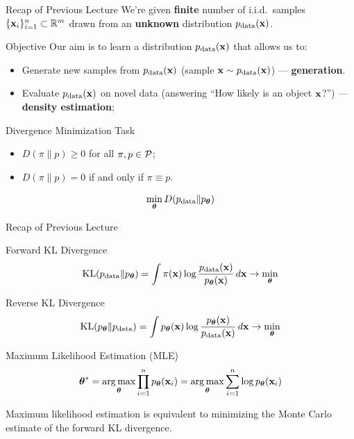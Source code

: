 \documentclass{beamer}
\begin{document}
\begin{frame}
\titlepage
\resetonslide
\end{frame}
\begin{frame}{Recap of Previous Lecture}
	We're given \textbf{finite} number of i.i.d.\ samples $\{\mathbf{x}_i\}_{i=1}^n \subset \mathbb{R}^m$ drawn from an \textbf{unknown} distribution $p_{\text{data}}(\mathbf{x})$.
	\begin{block}{Objective}
		Our aim is to learn a distribution $p_{\text{data}}(\mathbf{x})$ that allows us to: 
		\begin{itemize}
		    \item Generate new samples from $p_{\text{data}}(\mathbf{x})$ (sample $\mathbf{x} \sim p_{\text{data}}(\mathbf{x})$) --- \textbf{generation}.		    
		    \item Evaluate $p_{\text{data}}(\mathbf{x})$ on novel data (answering ``How likely is an object $\mathbf{x}$?'') --- \textbf{density estimation}; 
		\end{itemize}
	\end{block}

	\begin{block}{Divergence Minimization Task}
		\begin{itemize}
			\item $D(\pi \| p) \geq 0$ for all $\pi, p \in \mathcal{P}$;
			\item $D(\pi \| p) = 0$ if and only if $\pi \equiv p$.
		\end{itemize}
		\[
		\min_{\boldsymbol{\theta}} D(p_{\text{data}} \| p_{\boldsymbol{\theta}})
		\]
	\end{block}
\end{frame}
\begin{frame}{Recap of Previous Lecture}
	\begin{block}{Forward KL Divergence}
		\vspace{-0.2cm}
		\[
		\mathrm{KL}(p_{\text{data}} \| p_{\boldsymbol{\theta}}) = \int \pi (\mathbf{x}) \log \frac{p_{\text{data}}(\mathbf{x})}{p_{\boldsymbol{\theta}}(\mathbf{x})}\, d \mathbf{x} \rightarrow \min_{\boldsymbol{\theta}}
		\]
	\end{block}
	\begin{block}{Reverse KL Divergence}
		\vspace{-0.2cm}
		\[
		\mathrm{KL}(p_{\boldsymbol{\theta}} \| p_{\text{data}}) = \int p_{\boldsymbol{\theta}}(\mathbf{x}) \log \frac{p_{\boldsymbol{\theta}}(\mathbf{x})}{p_{\text{data}}(\mathbf{x})}\, d \mathbf{x} \rightarrow \min_{\boldsymbol{\theta}}
		\]
	\end{block}
	
	\begin{block}{Maximum Likelihood Estimation (MLE)}
		\vspace{-0.3cm}
		\[
		\boldsymbol{\theta}^* = \operatorname*{arg\,max}_{\boldsymbol{\theta}} \prod_{i=1}^n p_{\boldsymbol{\theta}}(\mathbf{x}_i) = \operatorname*{arg\,max}_{\boldsymbol{\theta}} \sum_{i=1}^n \log p_{\boldsymbol{\theta}}(\mathbf{x}_i)
		\]
		\vspace{-0.1cm}
	\end{block}
	Maximum likelihood estimation is equivalent to minimizing the Monte Carlo estimate of the forward KL divergence.
\end{frame}
\end{document}
